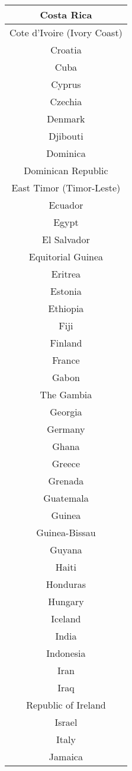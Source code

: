 \documentclass{article}
\begin{document}
\begin{center}
\begin{tabular} {|| c ||}
Costa Rica\\ \hline 
Cote d'Ivoire (Ivory Coast)\\ \hline 
Croatia\\ \hline 
Cuba\\ \hline 
Cyprus\\ \hline 
Czechia\\ \hline 
Denmark\\ \hline 
Djibouti\\ \hline 
Dominica\\ \hline 
Dominican Republic\\ \hline 
East Timor (Timor-Leste)\\ \hline 
Ecuador\\ \hline 
Egypt\\ \hline 
El Salvador\\ \hline 
Equitorial Guinea\\ \hline 
Eritrea\\ \hline 
Estonia\\ \hline 
Ethiopia\\ \hline 
Fiji\\ \hline 
Finland\\ \hline 
France\\ \hline 
Gabon\\ \hline 
The Gambia\\ \hline 
Georgia\\ \hline 
Germany\\ \hline 
Ghana\\ \hline 
Greece\\ \hline 
Grenada\\ \hline 
Guatemala\\ \hline 
Guinea\\ \hline 
Guinea-Bissau\\ \hline 
Guyana\\ \hline 
Haiti\\ \hline 
Honduras\\ \hline 
Hungary\\ \hline 
Iceland\\ \hline 
India\\ \hline 
Indonesia\\ \hline 
Iran\\ \hline 
Iraq\\ \hline 
Republic of Ireland\\ \hline 
Israel\\ \hline 
Italy\\ \hline 
Jamaica\\ \hline 

\end{tabular}
\end{center}
\end{document}
